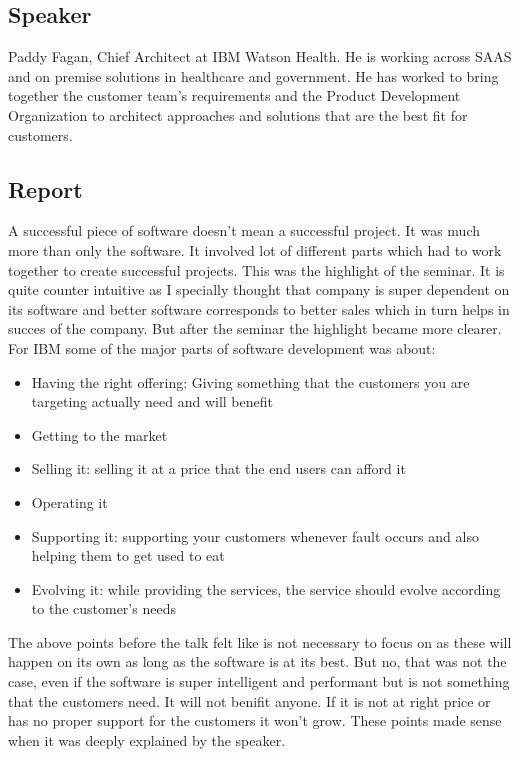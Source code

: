 \subsection{Speaker}

Paddy Fagan, Chief Architect at IBM Watson Health. He is working across SAAS and on premise solutions in healthcare and government. He has worked to bring together the customer team's requirements and the Product Development Organization to architect approaches and solutions that are the best fit for customers.

\subsection{Report}

A successful piece of software doesn't mean a successful project. It was much more than only the software. It involved lot of different parts which had to work together to create successful projects. This was the highlight of the seminar. It is quite counter intuitive as I specially thought that company is super dependent on its software and better software corresponds to better sales which in turn helps in succes of the company. But after the seminar the highlight became more clearer. For IBM some of the major parts of software development was about:

\begin{itemize}
    \item Having the right offering: Giving something that the customers you are targeting actually need and will benefit
    \item Getting to the market
    \item Selling it: selling it at a price that the end users can afford it
    \item Operating it
    \item Supporting it: supporting your customers whenever fault occurs and also helping them to get used to eat
    \item Evolving it: while providing the services, the service should evolve according to the customer's needs
\end{itemize}

The above points before the talk felt like is not necessary to focus on as these will happen on its own as long as the software is at its best. But no, that was not the case, even if the software is super intelligent and performant but is not something that the customers need. It will not benifit anyone. If it is not at right price or has no proper support for the customers it won't grow. These points made sense when it was deeply explained by the speaker.

